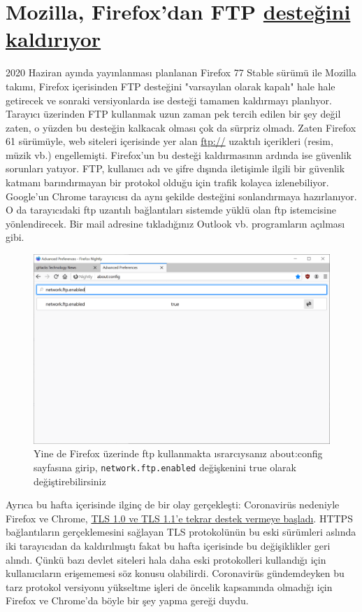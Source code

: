 \documentclass[11pt]{article}
\begin{document}
\section{Mozilla, Firefox'dan FTP \href{https://www.ghacks.net/2020/03/19/mozilla-will-remove-ftp-support-in-the-firefox-web-browser/}{desteğini kaldırıyor}}
\label{sec:org59fcd36}
2020 Haziran ayında yayınlanması planlanan Firefox 77 Stable sürümü ile
Mozilla takımı, Firefox içerisinden FTP desteğini "varsayılan olarak kapalı"
hale hale getirecek ve sonraki versiyonlarda ise desteği tamamen kaldırmayı
planlıyor. Tarayıcı üzerinden FTP kullanmak uzun zaman pek tercih edilen bir
şey değil zaten, o yüzden bu desteğin kalkacak olması çok da sürpriz olmadı.
Zaten Firefox 61 sürümüyle, web siteleri içerisinde yer alan \url{ftp://} uzaktılı
içerikleri (resim, müzik vb.) engellemişti. Firefox'un bu desteği
kaldırmasının ardında ise güvenlik sorunları yatıyor. FTP, kullanıcı adı ve
şifre dışında iletişimle ilgili bir güvenlik katmanı barındırmayan bir
protokol olduğu için trafik kolayca izlenebiliyor. Google'un Chrome tarayıcısı
da aynı şekilde desteğini sonlandırmaya hazırlanıyor. O da tarayıcıdaki ftp
uzantılı bağlantıları sistemde yüklü olan ftp istemcisine yönlendirecek. Bir
mail adresine tıkladığınız Outlook vb. programların açılması gibi.

\begin{figure}[htbp]
\centering
\includegraphics[width=.9\linewidth]{gorseller/firefox-ftp.png}
\caption[\texttt{network.ftp.enabled}]{Yine de Firefox üzerinde ftp kullanmakta ısrarcıysanız about:config sayfasına girip, \texttt{network.ftp.enabled} değişkenini true olarak değiştirebilirsiniz}
\end{figure}

Ayrıca bu hafta içerisinde ilginç de bir olay gerçekleşti: Coronavirüs
nedeniyle Firefox ve Chrome, \href{https://www.ghacks.net/2020/03/21/mozilla-re-enables-tls-1-0-and-1-1-because-of-coronavirus-and-google/}{TLS 1.0 ve TLS 1.1'e tekrar destek vermeye
başladı}. HTTPS bağlantıların gerçeklemesini sağlayan TLS protokolünün bu eski
sürümleri aslında iki tarayıcıdan da kaldırılmıştı fakat bu hafta içerisinde bu
değişiklikler geri alındı. Çünkü bazı devlet siteleri hala daha eski
protokolleri kullandığı için kullanıcıların erişememesi söz konusu olabilirdi.
Coronavirüs gündemdeyken bu tarz protokol versiyonu yükseltme işleri de öncelik
kapsamında olmadığı için Firefox ve Chrome'da böyle bir şey yapma gereği duydu.
\end{document}

